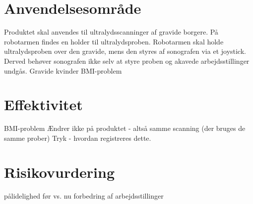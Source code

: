 \section{Anvendelsesområde}
Produktet skal anvendes til ultralydsscanninger af gravide borgere.
På robotarmen findes en holder til ultralydsproben. 
Robotarmen skal holde ultralydsproben over den gravide, mens den styres af sonografen via et joystick. Derved behøver sonografen ikke selv at styre proben og akavede arbejdsstillinger undgås. 
Gravide kvinder
BMI-problem
\section{Effektivitet}
BMI-problem
Ændrer ikke på produktet - altså samme scanning (der bruges de samme prober)
Tryk - hvordan registreres dette.
\section{Risikovurdering}
pålidelighed
før vs. nu
forbedring af arbejdsstillinger